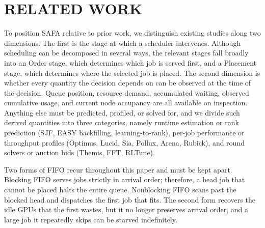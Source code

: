 \documentclass{ieeetj}
\begin{document}
\section{RELATED WORK}\label{Related}
To position SAFA relative to prior work, we distinguish existing studies along two dimensions. The first is the stage at which a scheduler intervenes. Although scheduling can be decomposed in several ways, the relevant stages fall broadly into an Order stage, which determines which job is served first, and a Placement stage, which determines where the selected job is placed. The second dimension is whether every quantity the decision depends on can be observed at the time of the decision. Queue position, resource demand, accumulated waiting, observed cumulative usage, and current node occupancy are all available on inspection. Anything else must be predicted, profiled, or solved for, and we divide such derived quantities into three categories, namely runtime estimation or rank prediction (SJF, EASY backfilling, learning-to-rank), per-job performance or throughput profiles (Optimus, Lucid, Sia, Pollux, Arena, Rubick), and round solvers or auction bids (Themis, FFT, RLTune).

Two forms of FIFO recur throughout this paper and must be kept apart. Blocking FIFO serves jobs strictly in arrival order; therefore, a head job that cannot be placed halts the entire queue. Nonblocking FIFO scans past the blocked head and dispatches the first job that fits. The second form recovers the idle GPUs that the first wastes, but it no longer preserves arrival order, and a large job it repeatedly skips can be starved indefinitely.
\end{document}
